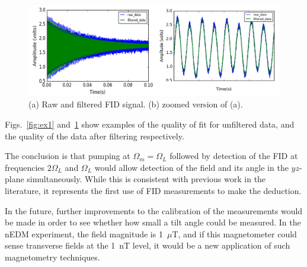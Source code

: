 \begin{figure}%
\centering\includegraphics[width=\linewidth]{figures/filtered_data.png}
\caption{(a) Raw and filtered FID signal. (b) zoomed version of
  (a).\label{fig:ex2}}
\end{figure}

Figs.~\ref{fig:ex1} and~\ref{fig:ex2} show examples of the quality of
fit for unfiltered data, and the quality of the data after filtering
respectively.

The conclusion is that pumping at $\Omega_m=\Omega_L$ followed by
detection of the FID at frequencies $2\Omega_L$ and $\Omega_L$ would
allow detection of the field and its angle in the $yz$-plane
simultaneously.  While this is consistent with previous work in the
literature, it represents the first use of FID measurements to make
the deduction.

In the future, further improvements to the calibration of the
measurements would be made in order to see whether how small a tilt
angle could be measured.  In the nEDM experiment, the field magnitude
is 1~$\mu$T, and if this magnetometer could sense transverse fields at
the 1~nT level, it would be a new application of such magnetometry
techniques.
